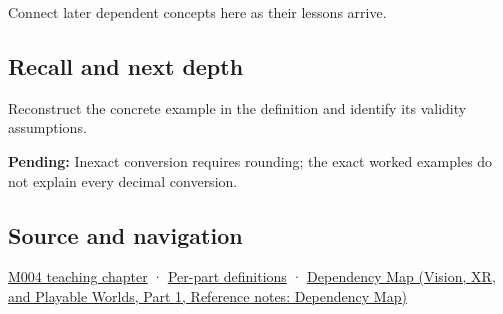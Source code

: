 \hypertarget{appendix-6854d0e2218e-used-by}{}

Connect later dependent concepts here as their lessons arrive.

\subsection{Recall and next depth}\label{appendix-6854d0e2218e-recall-and-next-depth}

\hypertarget{appendix-6854d0e2218e-recall-and-next-depth}{}

Reconstruct the concrete example in the definition and identify its validity assumptions.

\textbf{Pending:} Inexact conversion requires rounding; the exact worked examples do not explain every decimal conversion.

\subsection{Source and navigation}\label{appendix-6854d0e2218e-source-and-navigation}

\hypertarget{appendix-6854d0e2218e-source-and-navigation}{}

\hyperref[01-foundations-i-ch001-a-stretching-ruler-for-real-valued-quantities]{M004 teaching chapter} · \hyperref[appendix-fd090d982a15-m004---parts-61-76]{Per-part definitions} · \href{../07-Vision-XR-and-Playable-Worlds-P01/main.pdf\#nameddest=appendix-4ad47bdd269a}{Dependency Map (Vision, XR, and Playable Worlds, Part 1, Reference notes: Dependency Map)}
